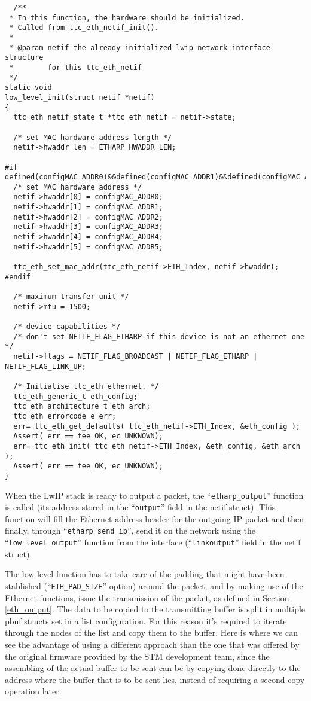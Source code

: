 \begin{lstlisting}
  /**
 * In this function, the hardware should be initialized.
 * Called from ttc_eth_netif_init().
 *
 * @param netif the already initialized lwip network interface structure
 *        for this ttc_eth_netif
 */
static void
low_level_init(struct netif *netif)
{
  ttc_eth_netif_state_t *ttc_eth_netif = netif->state;
  
  /* set MAC hardware address length */
  netif->hwaddr_len = ETHARP_HWADDR_LEN;

#if defined(configMAC_ADDR0)&&defined(configMAC_ADDR1)&&defined(configMAC_ADDR2)&&defined(configMAC_ADDR3)&&defined(configMAC_ADDR4)&&defined(configMAC_ADDR5)
  /* set MAC hardware address */
  netif->hwaddr[0] = configMAC_ADDR0;
  netif->hwaddr[1] = configMAC_ADDR1;
  netif->hwaddr[2] = configMAC_ADDR2;
  netif->hwaddr[3] = configMAC_ADDR3;
  netif->hwaddr[4] = configMAC_ADDR4;
  netif->hwaddr[5] = configMAC_ADDR5;

  ttc_eth_set_mac_addr(ttc_eth_netif->ETH_Index, netif->hwaddr);
#endif
  
  /* maximum transfer unit */
  netif->mtu = 1500;
  
  /* device capabilities */
  /* don't set NETIF_FLAG_ETHARP if this device is not an ethernet one */
  netif->flags = NETIF_FLAG_BROADCAST | NETIF_FLAG_ETHARP | NETIF_FLAG_LINK_UP;
 
  /* Initialise ttc_eth ethernet. */
  ttc_eth_generic_t eth_config;
  ttc_eth_architecture_t eth_arch;
  ttc_eth_errorcode_e err;
  err= ttc_eth_get_defaults( ttc_eth_netif->ETH_Index, &eth_config );
  Assert( err == tee_OK, ec_UNKNOWN);
  err= ttc_eth_init( ttc_eth_netif->ETH_Index, &eth_config, &eth_arch );
  Assert( err == tee_OK, ec_UNKNOWN);
}
\end{lstlisting}


When the LwIP stack is ready to output a packet, the ``\verb/etharp_output/'' function is called (its address stored in the ``\verb/output/'' field in the netif struct). This function will fill the Ethernet address header for the outgoing IP packet and then finally, through ``\verb/etharp_send_ip/'', send it on the network using the ``\verb/low_level_output/'' function from the interface (``\verb/linkoutput/'' field in the netif struct).

The low level function has to take care of the padding that might have been stablished (``\verb/ETH_PAD_SIZE/'' option) around the packet, and by making use of the Ethernet functions, issue the transmission of the packet, as defined in Section \ref{eth_output}. The data to be copied to the transmitting buffer is split in multiple pbuf structs set in a list configuration. For this reason it's required to iterate through the nodes of the list and copy them to the buffer. Here is where we can see the advantage of using a different approach than the one that was offered by the original firmware provided by the STM development team, since the assembling of the actual buffer to be sent can be by copying done directly to the address where the buffer that is to be sent lies, instead of requiring a second copy operation later.

